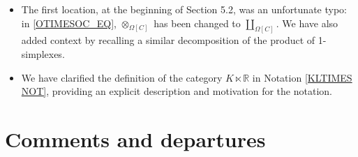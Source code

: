 \documentclass{article}
\begin{document}
\begin{itemize}
\item The first location, at the beginning of Section 5.2, was an unfortunate typo: %
      in \eqref{OTIMESOC_EQ}, $\otimes_{\Omega[C]}$ has been changed to $\coprod_{\Omega[C]}$.
      We have also added context by recalling a similar decomposition of the product of 1-simplexes.

\item
      We have clarified the definition of the category $K \ltimes \mathbb R$ in Notation \ref{KLTIMES NOT},
      providing an explicit description and motivation for the notation.
\end{itemize}

      

\section{Comments and departures} %
\end{document}
